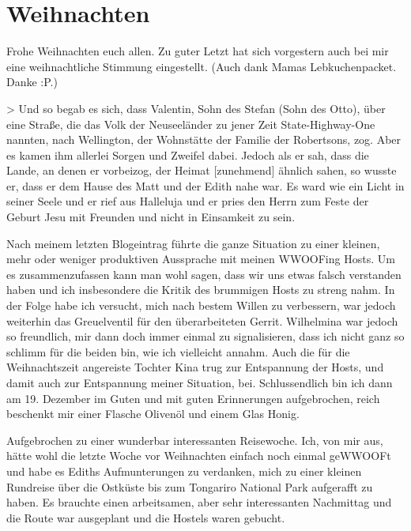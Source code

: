 \chapter{Weihnachten}

Frohe Weihnachten euch allen. Zu guter Letzt hat sich vorgestern auch
bei mir eine weihnachtliche Stimmung eingestellt. (Auch dank Mamas
Lebkuchenpacket. Danke :P.)

\textgreater{} Und so begab es sich, dass Valentin, Sohn des Stefan
(Sohn des Otto), über eine Straße, die das Volk der Neuseeländer zu
jener Zeit State-Highway-One nannten, nach Wellington, der Wohnstätte
der Familie der Robertsons, zog. Aber es kamen ihm allerlei Sorgen und
Zweifel dabei. Jedoch als er sah, dass die Lande, an denen er vorbeizog,
der Heimat {[}zunehmend{]} ähnlich sahen, so wusste er, dass er dem
Hause des Matt und der Edith nahe war. Es ward wie ein Licht in seiner
Seele und er rief aus Halleluja und er pries den Herrn zum Feste der
Geburt Jesu mit Freunden und nicht in Einsamkeit zu sein.

Nach meinem letzten Blogeintrag führte die ganze Situation zu einer
kleinen, mehr oder weniger produktiven Aussprache mit meinen WWOOFing
Hosts. Um es zusammenzufassen kann man wohl sagen, dass wir uns etwas
falsch verstanden haben und ich insbesondere die Kritik des brummigen
Hosts zu streng nahm. In der Folge habe ich versucht, mich nach bestem
Willen zu verbessern, war jedoch weiterhin das Greuelventil für den
überarbeiteten Gerrit. Wilhelmina war jedoch so freundlich, mir dann
doch immer einmal zu signalisieren, dass ich nicht ganz so schlimm für
die beiden bin, wie ich vielleicht annahm. Auch die für die
Weihnachtszeit angereiste Tochter Kina trug zur Entspannung der Hosts,
und damit auch zur Entspannung meiner Situation, bei. Schlussendlich bin
ich dann am 19. Dezember im Guten und mit guten Erinnerungen
aufgebrochen, reich beschenkt mir einer Flasche Olivenöl und einem Glas
Honig.

Aufgebrochen zu einer wunderbar interessanten Reisewoche. Ich, von mir
aus, hätte wohl die letzte Woche vor Weihnachten einfach noch einmal
geWWOOFt und habe es Ediths Aufmunterungen zu verdanken, mich zu einer
kleinen Rundreise über die Ostküste bis zum Tongariro National Park
aufgerafft zu haben. Es brauchte einen arbeitsamen, aber sehr
interessanten Nachmittag und die Route war ausgeplant und die Hostels
waren gebucht.

